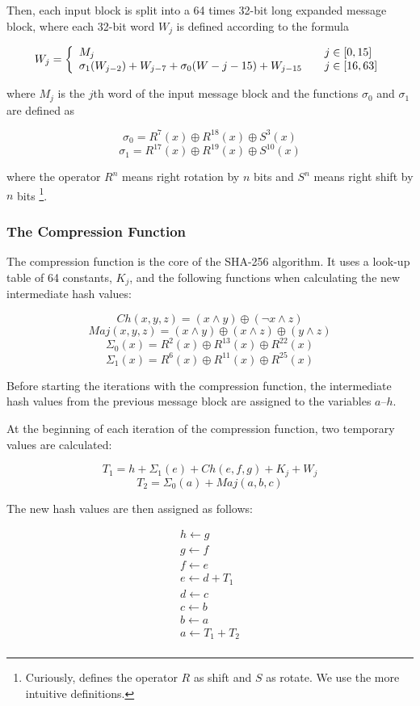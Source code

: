 Then, each input block is split into a 64 times 32-bit long expanded message block, where
each 32-bit word $W_j$ is defined according to the formula

\[ W_j = \left\{
	\begin{array}{l l}
		M_j & \quad j \in \left[0, 15\right]\\
		\sigma_1(W_{j - 2}) + W_{j - 7} + \sigma_0(W-{j - 15}) + W_{j - 15} & \quad j \in \left[16, 63\right]
	\end{array}
\right.\]

\noindent where $M_j$ is the $j$th word of the input message block and the functions
$\sigma_0$ and $\sigma_1$ are defined as

\[\sigma_0 = R^7(x) \oplus R^{18}(x) \oplus S^3(x)\]
\[\sigma_1 = R^{17}(x) \oplus R^{19}(x) \oplus S^{10}(x)\]

\noindent where the operator $R^n$ means right rotation by $n$ bits and $S^n$ means right shift by $n$
bits \footnote{Curiously, \cite{sha-spec} defines the operator $R$ as shift and $S$ as rotate.
We use the more intuitive definitions.}.

\subsubsection{The Compression Function}
\label{sec:sha-compr}
The compression function is the core of the SHA-256 algorithm. It uses a look-up table
of 64 constants, $K_j$, and the following functions when calculating the new intermediate
hash values:

\[Ch(x,y,z) = (x \wedge y) \oplus (\neg x \wedge z)\]
\[Maj(x, y, z) = (x \wedge y) \oplus (x \wedge z) \oplus (y \wedge z)\]
\[\Sigma_0(x) = R^2(x) \oplus R^{13}(x) \oplus R^{22}(x)\]
\[\Sigma_1(x) = R^6(x) \oplus R^{11}(x) \oplus R^{25}(x)\]

Before starting the iterations with the compression function, the intermediate
hash values from the previous message block are assigned to the variables $a$--$h$.

At the beginning of each iteration of the compression function, two temporary
values are calculated:

\[T_1 = h + \Sigma_1(e) + Ch(e, f, g) + K_j + W_j\]
\[T_2 = \Sigma_0(a) + Maj(a, b, c)\]

The new hash values are then assigned as follows:

\[\begin{array}{l}
	h \leftarrow g \\
	g \leftarrow f \\
	f \leftarrow e \\
	e \leftarrow d + T_1\\
	d \leftarrow c \\
	c \leftarrow b \\
	b \leftarrow a \\
	a \leftarrow T_1 + T_2 \\
\end{array}\]

